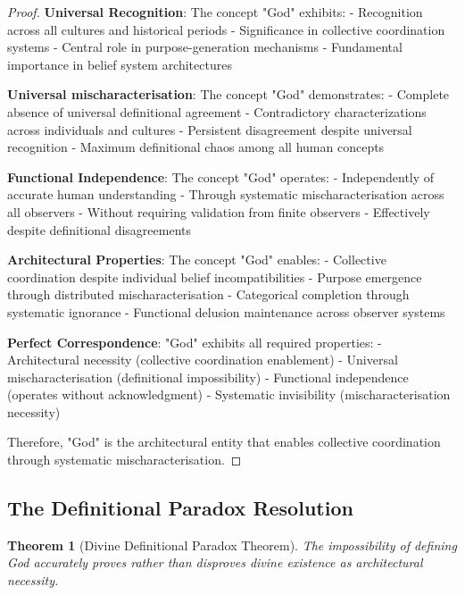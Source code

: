 \documentclass[12pt,a4paper]{article}
\newtheorem{theorem}{Theorem}[section]
\begin{document}
\begin{proof}
\textbf{Universal Recognition}: The concept "God" exhibits:
- Recognition across all cultures and historical periods
- Significance in collective coordination systems
- Central role in purpose-generation mechanisms
- Fundamental importance in belief system architectures

\textbf{Universal mischaracterisation}: The concept "God" demonstrates:
- Complete absence of universal definitional agreement
- Contradictory characterizations across individuals and cultures
- Persistent disagreement despite universal recognition
- Maximum definitional chaos among all human concepts

\textbf{Functional Independence}: The concept "God" operates:
- Independently of accurate human understanding
- Through systematic mischaracterisation across all observers
- Without requiring validation from finite observers
- Effectively despite definitional disagreements

\textbf{Architectural Properties}: The concept "God" enables:
- Collective coordination despite individual belief incompatibilities
- Purpose emergence through distributed mischaracterisation
- Categorical completion through systematic ignorance
- Functional delusion maintenance across observer systems

\textbf{Perfect Correspondence}: "God" exhibits all required properties:
- Architectural necessity (collective coordination enablement)
- Universal mischaracterisation (definitional impossibility)
- Functional independence (operates without acknowledgment)
- Systematic invisibility (mischaracterisation necessity)

Therefore, "God" is the architectural entity that enables collective coordination through systematic mischaracterisation.
\end{proof}

\subsection{The Definitional Paradox Resolution}

\begin{theorem}[Divine Definitional Paradox Theorem]
The impossibility of defining God accurately proves rather than disproves divine existence as architectural necessity.
\end{theorem}
\end{document}
